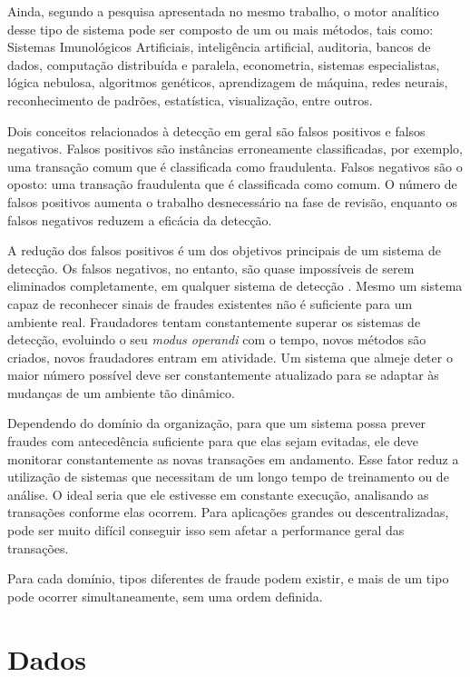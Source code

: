 Ainda, segundo a pesquisa apresentada no mesmo trabalho, o motor analítico desse tipo de sistema pode ser composto de um ou mais métodos, tais como: Sistemas Imunológicos Artificiais, inteligência artificial, auditoria, bancos de dados, computação distribuída e paralela, econometria, sistemas especialistas, lógica nebulosa, algoritmos genéticos, aprendizagem de máquina, redes neurais, reconhecimento de padrões, estatística, visualização, entre outros.

Dois conceitos relacionados à detecção em geral são falsos positivos e falsos negativos. Falsos positivos são instâncias erroneamente classificadas, por exemplo, uma transação comum que é classificada como fraudulenta. Falsos negativos são o oposto: uma transação fraudulenta que é classificada como comum. O número de falsos positivos aumenta o trabalho desnecessário na fase de revisão, enquanto os falsos negativos reduzem a eficácia da detecção.

A redução dos falsos positivos é um dos objetivos principais de um sistema de detecção. Os falsos negativos, no entanto, são quase impossíveis de serem eliminados completamente, em qualquer sistema de detecção \cite{Michie1994}. Mesmo um sistema capaz de reconhecer sinais de fraudes existentes não é suficiente para um ambiente real. Fraudadores tentam constantemente superar os sistemas de detecção, evoluindo o seu \emph{modus operandi} com o tempo, novos métodos são criados, novos fraudadores entram em atividade. Um sistema que almeje deter o maior número possível deve ser constantemente atualizado para se adaptar às mudanças de um ambiente tão dinâmico.

Dependendo do domínio da organização, para que um sistema possa prever fraudes com antecedência suficiente para que elas sejam evitadas, ele deve monitorar constantemente as novas transações em andamento. Esse fator reduz a utilização de sistemas que necessitam de um longo tempo de treinamento ou de análise. O ideal seria que ele estivesse em constante execução, analisando as transações conforme elas ocorrem. Para aplicações grandes ou descentralizadas, pode ser muito difícil conseguir isso sem afetar a performance geral das transações.

Para cada domínio, tipos diferentes de fraude podem existir, e mais de um tipo pode ocorrer simultaneamente, sem uma ordem definida.

\section{Dados}
\label{sec:fraud_data}

